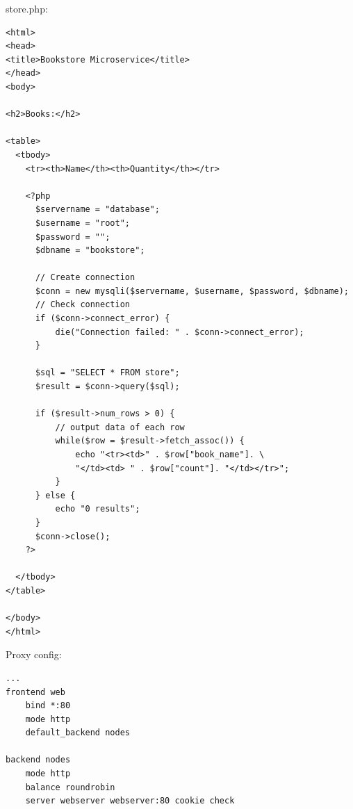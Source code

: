 \documentclass[11pt,magyar,a4paper,oneside,]{report}
\begin{document}
store.php:

\begin{verbatim}
<html>
<head>
<title>Bookstore Microservice</title>
</head>
<body>

<h2>Books:</h2>

<table>
  <tbody>
    <tr><th>Name</th><th>Quantity</th></tr>

    <?php
      $servername = "database";
      $username = "root";
      $password = "";
      $dbname = "bookstore";

      // Create connection
      $conn = new mysqli($servername, $username, $password, $dbname);
      // Check connection
      if ($conn->connect_error) {
          die("Connection failed: " . $conn->connect_error);
      }

      $sql = "SELECT * FROM store";
      $result = $conn->query($sql);

      if ($result->num_rows > 0) {
          // output data of each row
          while($row = $result->fetch_assoc()) {
              echo "<tr><td>" . $row["book_name"]. \
              "</td><td> " . $row["count"]. "</td></tr>";
          }
      } else {
          echo "0 results";
      }
      $conn->close();
    ?>

  </tbody>
</table>

</body>
</html>
\end{verbatim}

Proxy config:

\begin{verbatim}
...
frontend web
    bind *:80
    mode http
    default_backend nodes

backend nodes
    mode http
    balance roundrobin
    server webserver webserver:80 cookie check
\end{verbatim}
\end{document}
